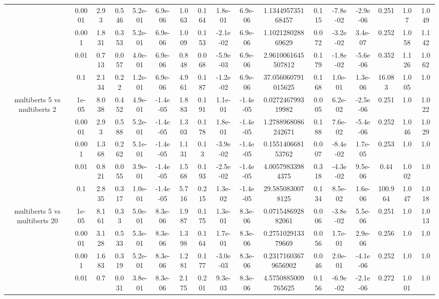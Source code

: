 \begin{tabular}{|c|c|c|c|c|c|c|c|c|c|c|c|c|c|c|c|c|}
 & 0.0001 & 2.93 & 0.546 & 5.2e-01 & 6.9e-06 & 1.063 & 0.164 & 1.8e-01 & 6.9e-06 & 1.134495735168457 & 0.115 & -7.8e-02 & -2.9e-06 & 0.251 & 1.07 & 1.049 \\
 & 0.001 & 1.831 & 0.353 & 5.2e-01 & 6.9e-06 & 1.009 & 0.153 & -2.1e-02 & 6.9e-06 & 1.102128028869629 & 0.072 & -3.2e-02 & 3.4e-07 & 0.252 & 1.058 & 1.142 \\
 & 0.01 & 0.713 & 0.057 & 4.0e-01 & 6.9e-06 & 0.848 & 0.068 & -5.9e-03 & 6.9e-06 & 2.9610061645507812 & 0.179 & -1.8e-02 & -5.6e-06 & 0.352 & 1.126 & 1.062 \\
 & 0.1 & 2.134 & 0.22 & 1.2e-01 & 6.9e-06 & 4.961 & 0.187 & -1.2e-02 & 6.9e-06 & 37.056060791015625 & 0.168 & 1.0e-01 & 1.3e-06 & 16.083 & 1.005 & 1.0 \\
\hline
\multirow{5}{*}{multiberts 5 vs multiberts 2} & 1e-05 & 8.038 & 0.452 & 4.9e-01 & -1.4e-05 & 1.883 & 0.191 & 1.1e-01 & -1.4e-05 & 0.027246799319982 & 0.005 & 6.2e-02 & -2.5e-06 & 0.251 & 1.0 & 1.022 \\
 & 0.0001 & 2.93 & 0.588 & 5.2e-01 & -1.4e-05 & 1.303 & 0.178 & 1.8e-01 & -1.4e-05 & 1.2788968086242671 & 0.188 & 7.6e-02 & -5.4e-06 & 0.252 & 1.046 & 1.029 \\
 & 0.001 & 1.368 & 0.262 & 5.1e-01 & -1.4e-05 & 1.131 & 0.13 & -3.9e-02 & -1.4e-05 & 0.155140668153762 & 0.007 & -8.4e-02 & 1.7e-05 & 0.253 & 1.0 & 1.0 \\
 & 0.01 & 0.821 & 0.055 & 3.9e-01 & -1.4e-05 & 1.568 & 0.193 & -2.5e-02 & -1.4e-05 & 4.00579833984375 & 0.318 & -4.3e-02 & 9.5e-06 & 0.44 & 1.002 & 1.0 \\
 & 0.1 & 2.835 & 0.317 & 1.0e-01 & -1.4e-05 & 5.716 & 0.215 & 1.3e-02 & -1.4e-05 & 29.5850830078125 & 0.134 & 8.5e-02 & 1.6e-06 & 100.964 & 1.047 & 1.018 \\
\hline
\multirow{5}{*}{multiberts 5 vs multiberts 20} & 1e-05 & 8.161 & 0.33 & 5.0e-01 & 8.3e-06 & 1.987 & 0.175 & 1.3e-01 & 8.3e-06 & 0.071548692882061 & 0.006 & -3.8e-02 & 5.5e-06 & 0.251 & 1.0 & 1.013 \\
 & 0.0001 & 3.128 & 0.533 & 5.3e-01 & 8.3e-06 & 1.398 & 0.164 & 1.7e-01 & 8.3e-06 & 0.275102913379669 & 0.056 & 1.7e-01 & 2.9e-06 & 0.256 & 1.0 & 1.0 \\
 & 0.001 & 1.683 & 0.319 & 5.2e-01 & 8.3e-06 & 1.281 & 0.177 & -3.0e-03 & 8.3e-06 & 0.23171603679656902 & 0.046 & 2.0e-01 & -4.1e-06 & 0.252 & 1.0 & 1.0 \\
 & 0.01 & 0.7 & 0.031 & 3.8e-01 & 8.3e-06 & 2.175 & 0.201 & 9.3e-03 & 8.3e-06 & 4.5750885009765625 & 0.156 & -6.9e-02 & -2.1e-06 & 0.272 & 1.001 & 1.0 \\

\end{tabular}
